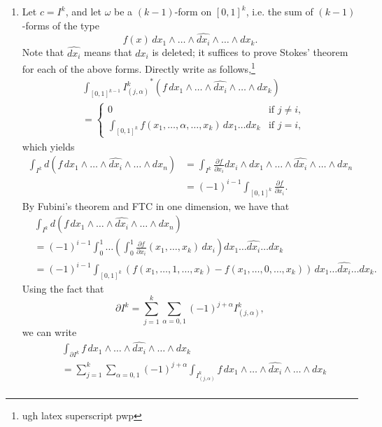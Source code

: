 \begin{enumerate}[label=(\roman*)]
    \item Let $c = I^k$, and let $\omega$ be a $(k-1)$-form on $[0, 1]^k$, i.e. the sum of $(k-1)$-forms of the type
    \[ f(x) \, dx_1 \wedge \dots \wedge \widehat{dx_i} \wedge \dots \wedge dx_k. \]
    Note that $\widehat{dx_i}$ means that $dx_i$ is deleted; it suffices to prove Stokes' theorem for each of the above forms. Directly write as follows,\footnote{ugh latex superscript pwp}
    \begin{align*}
        &\int_{[0, 1]^{k-1}} {I^k_{(j, \alpha)}}^\ast \left(f \, dx_1 \wedge \dots \wedge \widehat{dx_i} \wedge \dots \wedge dx_k\right) \\
        &= \begin{cases} 0 & \text{if } j \neq i, \\ \displaystyle \int_{[0, 1]^k} f(x_1, \dots, \alpha, \dots, x_k) \, dx_1 \dots dx_k & \text{if } j = i, \end{cases}
    \end{align*}
    which yields
    \begin{align*}
        \int_{I^k} d \left(f \, dx_1 \wedge \dots \wedge \widehat{dx_i} \wedge \dots \wedge dx_n \right) &= \int_{I^k} \frac{\partial f}{\partial x_i} dx_i \wedge dx_1 \wedge \dots \wedge \widehat{dx_i} \wedge \dots \wedge dx_n \\
        &= (-1)^{i-1} \int_{[0, 1]^k} \frac{\partial f}{\partial x_i}.
    \end{align*}
    By Fubini's theorem and FTC in one dimension, we have that
    \begin{align*}
        & \int_{I^k} d \left(f \, dx_1 \wedge \dots \wedge \widehat{dx_i} \wedge \dots \wedge dx_n \right) \\
        &= (-1)^{i-1} \int_0^1 \dots \left(\int_0^1 \frac{\partial f}{\partial x_i}(x_1, \dots, x_k) \, dx_i\right) dx_1 \dots \widehat{dx_i} \dots dx_k \\
        &= (-1)^{i-1} \int_{[0, 1]^k} \left(f(x_1, \dots, 1, \dots, x_k) - f(x_1, \dots, 0, \dots, x_k) \right) \, dx_1 \dots \widehat{dx_i} \dots dx_k.
    \end{align*}
    Using the fact that
    \[ \partial I^k = \sum_{j=1}^k \sum_{\alpha = 0, 1} (-1)^{j + \alpha} I^k_{(j, \alpha)}, \]
    we can write
    \begin{align*}
        & \int_{\partial I^k} f \, dx_1 \wedge \dots \wedge \widehat{dx_i} \wedge \dots \wedge dx_k \\
        &= \sum_{j=1}^k \sum_{\alpha = 0, 1} (-1)^{j + \alpha} \int_{I^k_{(j, \alpha)}} f \, dx_1 \wedge \dots \wedge \widehat{dx_i} \wedge \dots \wedge dx_k \\

\end{align*}
\end{enumerate}
